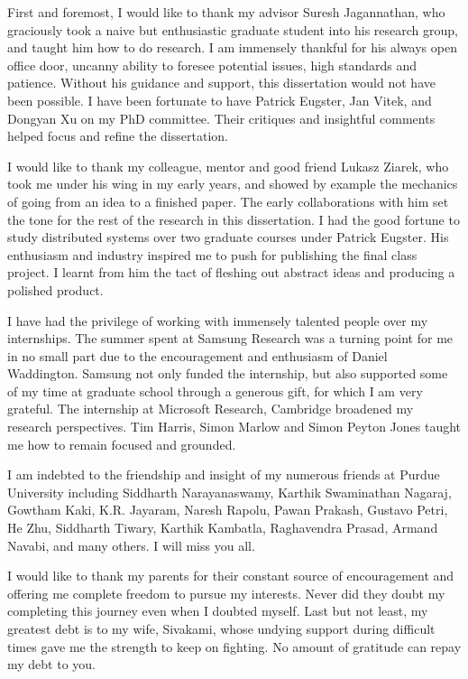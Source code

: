 \begin{acknowledgments}

First and foremost, I would like to thank my advisor Suresh Jagannathan, who
graciously took a naive but enthusiastic graduate student into his research
group, and taught him how to do research. I am immensely thankful for his
always open office door, uncanny ability to foresee potential issues, high
standards and patience. Without his guidance and support, this dissertation
would not have been possible. I have been fortunate to have Patrick Eugster,
Jan Vitek, and Dongyan Xu on my PhD committee. Their critiques and insightful
comments helped focus and refine the dissertation.

I would like to thank my colleague, mentor and good friend Lukasz Ziarek, who
took me under his wing in my early years, and showed by example the mechanics
of going from an idea to a finished paper. The early collaborations with him
set the tone for the rest of the research in this dissertation. I had the good
fortune to study distributed systems over two graduate courses under Patrick
Eugster. His enthusiasm and industry inspired me to push for publishing the
final class project. I learnt from him the tact of fleshing out abstract ideas
and producing a polished product.

I have had the privilege of working with immensely talented people over my
internships. The summer spent at Samsung Research was a turning point for me in
no small part due to the encouragement and enthusiasm of Daniel Waddington.
Samsung not only funded the internship, but also supported some of my time at
graduate school through a generous gift, for which I am very grateful. The
internship at Microsoft Research, Cambridge broadened my research perspectives.
Tim Harris, Simon Marlow and Simon Peyton Jones taught me how to remain focused
and grounded.

I am indebted to the friendship and insight of my numerous friends at Purdue
University including Siddharth Narayanaswamy, Karthik Swaminathan Nagaraj,
Gowtham Kaki, K.R. Jayaram, Naresh Rapolu, Pawan Prakash, Gustavo Petri, He
Zhu, Siddharth Tiwary, Karthik Kambatla, Raghavendra Prasad, Armand Navabi, and
many others. I will miss you all.

I would like to thank my parents for their constant source of encouragement and
offering me complete freedom to pursue my interests. Never did they doubt my
completing this journey even when I doubted myself. Last but not least, my
greatest debt is to my wife, Sivakami, whose undying support during difficult
times gave me the strength to keep on fighting. No amount of gratitude can
repay my debt to you.
\end{acknowledgments}

